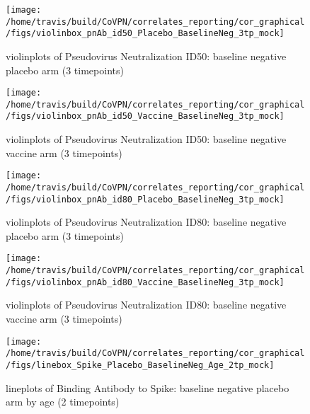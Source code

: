 \documentclass[]{book}
\theoremstyle{definition}
\theoremstyle{definition}
\theoremstyle{definition}
\newcommand{\1}{\mathbbm{1}}
\begin{document}
\clearpage
\begin{figure}[H]

{\centering \texttt{[image: /home/travis/build/CoVPN/correlates\_reporting/cor\_graphical/figs/violinbox\_pnAb\_id50\_Placebo\_BaselineNeg\_3tp\_mock]} 

}

\caption{violinplots of Pseudovirus Neutralization ID50: baseline negative placebo arm (3 timepoints)}\label{fig:unnamed-chunk-55}
\end{figure}

\clearpage
\begin{figure}[H]

{\centering \texttt{[image: /home/travis/build/CoVPN/correlates\_reporting/cor\_graphical/figs/violinbox\_pnAb\_id50\_Vaccine\_BaselineNeg\_3tp\_mock]} 

}

\caption{violinplots of Pseudovirus Neutralization ID50: baseline negative vaccine arm (3 timepoints)}\label{fig:unnamed-chunk-56}
\end{figure}

\clearpage
\begin{figure}[H]

{\centering \texttt{[image: /home/travis/build/CoVPN/correlates\_reporting/cor\_graphical/figs/violinbox\_pnAb\_id80\_Placebo\_BaselineNeg\_3tp\_mock]} 

}

\caption{violinplots of Pseudovirus Neutralization ID80: baseline negative placebo arm (3 timepoints)}\label{fig:unnamed-chunk-57}
\end{figure}

\clearpage
\begin{figure}[H]

{\centering \texttt{[image: /home/travis/build/CoVPN/correlates\_reporting/cor\_graphical/figs/violinbox\_pnAb\_id80\_Vaccine\_BaselineNeg\_3tp\_mock]} 

}

\caption{violinplots of Pseudovirus Neutralization ID80: baseline negative vaccine arm (3 timepoints)}\label{fig:unnamed-chunk-58}
\end{figure}

\clearpage
\begin{figure}[H]

{\centering \texttt{[image: /home/travis/build/CoVPN/correlates\_reporting/cor\_graphical/figs/linebox\_Spike\_Placebo\_BaselineNeg\_Age\_2tp\_mock]} 

}

\caption{lineplots of Binding Antibody to Spike: baseline negative placebo arm by age (2 timepoints)}\label{fig:unnamed-chunk-59}
\end{figure}
\end{document}
